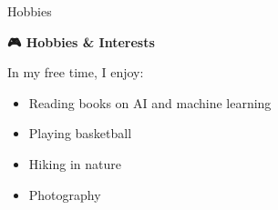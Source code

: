 \begin{section}{Hobbies}
\label{sec:hobbies}

\begin{center}
\huge{\textbf{🎮 Hobbies \& Interests}}
\end{center}

In my free time, I enjoy:

\begin{itemize}
  \item Reading books on AI and machine learning
  \item Playing basketball
  \item Hiking in nature
  \item Photography
\end{itemize}
\end{section} 